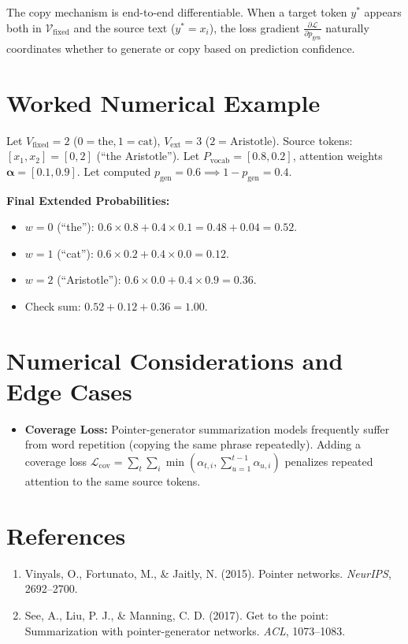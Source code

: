 \documentclass[11pt,a4paper]{article}
\theoremstyle{definition}
\begin{document}
The copy mechanism is end-to-end differentiable. When a target token $y^*$ appears both in $\mathcal{V}_{\text{fixed}}$ and the source text ($y^* = x_i$), the loss gradient $\frac{\partial \mathcal{L}}{\partial p_{\text{gen}}}$ naturally coordinates whether to generate or copy based on prediction confidence.

\section{Worked Numerical Example}

Let $V_{\text{fixed}} = 2$ ($0=\text{the}, 1=\text{cat}$), $V_{\text{ext}} = 3$ ($2=\text{Aristotle}$).
Source tokens: $[x_1, x_2] = [0, 2]$ (``the Aristotle'').
Let $P_{\text{vocab}} = [0.8, 0.2]$, attention weights $\boldsymbol{\alpha} = [0.1, 0.9]$.
Let computed $p_{\text{gen}} = 0.6 \implies 1 - p_{\text{gen}} = 0.4$.

\textbf{Final Extended Probabilities:}
\begin{itemize}
    \item $w=0$ (``the''): $0.6 \times 0.8 + 0.4 \times 0.1 = 0.48 + 0.04 = 0.52$.
    \item $w=1$ (``cat''): $0.6 \times 0.2 + 0.4 \times 0.0 = 0.12$.
    \item $w=2$ (``Aristotle''): $0.6 \times 0.0 + 0.4 \times 0.9 = 0.36$.
    \item Check sum: $0.52 + 0.12 + 0.36 = 1.00$.
\end{itemize}

\section{Numerical Considerations and Edge Cases}

\begin{itemize}
    \item \textbf{Coverage Loss:} Pointer-generator summarization models frequently suffer from word repetition (copying the same phrase repeatedly). Adding a coverage loss $\mathcal{L}_{\text{cov}} = \sum_t \sum_i \min(\alpha_{t, i}, \sum_{u=1}^{t-1} \alpha_{u, i})$ penalizes repeated attention to the same source tokens.
\end{itemize}

\section{References}
\begin{enumerate}
    \item Vinyals, O., Fortunato, M., & Jaitly, N. (2015). Pointer networks. \emph{NeurIPS}, 2692--2700.
    \item See, A., Liu, P. J., & Manning, C. D. (2017). Get to the point: Summarization with pointer-generator networks. \emph{ACL}, 1073--1083.
\end{enumerate}
\end{document}
